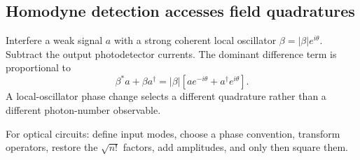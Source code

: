 \subsection{Homodyne detection accesses field quadratures}
Interfere a weak signal \(a\) with a strong coherent
local oscillator \(\beta=|\beta|e^{i\theta}\).
Subtract the output photodetector currents.
The dominant difference term is proportional to
\[
\beta^*a+\beta a^\dagger
=|\beta|[ae^{-i\theta}+a^\dagger e^{i\theta}].
\]
A local-oscillator phase change selects
a different quadrature rather than a different
photon-number observable.

\begin{checkpoint}
For optical circuits: define input modes,
choose a phase convention, transform operators,
restore the \(\sqrt{n!}\) factors, add
amplitudes, and only then square them.
\end{checkpoint}
